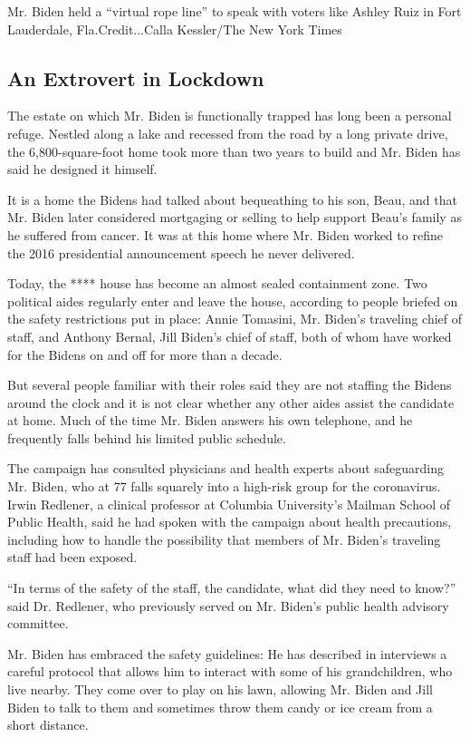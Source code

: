 Mr. Biden held a ``virtual rope line'' to speak with voters like Ashley
Ruiz in Fort Lauderdale, Fla.Credit...Calla Kessler/The New York Times

\hypertarget{an-extrovert-in-lockdown}{%
\subsection{An Extrovert in Lockdown}\label{an-extrovert-in-lockdown}}

The estate on which Mr. Biden is functionally trapped has long been a
personal refuge. Nestled along a lake and recessed from the road by a
long private drive, the 6,800-square-foot home took more than two years
to build and Mr. Biden has said he designed it himself.

It is a home the Bidens had talked about bequeathing to his son, Beau,
and that Mr. Biden later considered mortgaging or selling to help
support Beau's family as he suffered from cancer. It was at this home
where Mr. Biden worked to refine the 2016 presidential announcement
speech he never delivered.

Today, the **** house has become an almost sealed containment zone. Two
political aides regularly enter and leave the house, according to people
briefed on the safety restrictions put in place: Annie Tomasini, Mr.
Biden's traveling chief of staff, and Anthony Bernal, Jill Biden's chief
of staff, both of whom have worked for the Bidens on and off for more
than a decade.

But several people familiar with their roles said they are not staffing
the Bidens around the clock and it is not clear whether any other aides
assist the candidate at home. Much of the time Mr. Biden answers his own
telephone, and he frequently falls behind his limited public schedule.

The campaign has consulted physicians and health experts about
safeguarding Mr. Biden, who at 77 falls squarely into a high-risk group
for the coronavirus. Irwin Redlener, a clinical professor at Columbia
University's Mailman School of Public Health, said he had spoken with
the campaign about health precautions, including how to handle the
possibility that members of Mr. Biden's traveling staff had been
exposed.

``In terms of the safety of the staff, the candidate, what did they need
to know?'' said Dr. Redlener, who previously served on Mr. Biden's
public health advisory committee.

Mr. Biden has embraced the safety guidelines: He has described in
interviews a careful protocol that allows him to interact with some of
his grandchildren, who live nearby. They come over to play on his lawn,
allowing Mr. Biden and Jill Biden to talk to them and sometimes throw
them candy or ice cream from a short distance.

